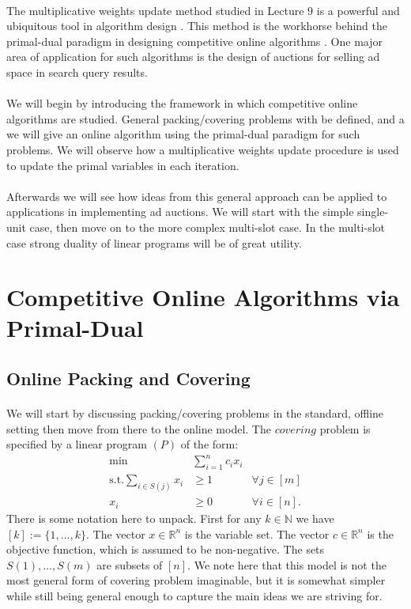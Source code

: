 \documentclass[letterpaper,12pt,oneside,onecolumn]{article}
\newcommand{\N}{\mathbb{N}} \newcommand{\R}{\mathbb{R}}
\begin{document}
\paragraph{}
The multiplicative weights update method studied in Lecture $9$ is a powerful and ubiquitous tool in algorithm design \cite{arora2012multiplicative}. This method is the workhorse behind the primal-dual paradigm in designing competitive online algorithms \cite{buchbinder2009design}. One major area of application for such algorithms is the design of auctions for selling ad space in search query results.
\paragraph{}
We will begin by introducing the framework in which competitive online algorithms are studied. General packing/covering problems with be defined, and a we will give an online algorithm using the primal-dual paradigm for such problems. We will observe how a multiplicative weights update procedure is used to update the primal variables in each iteration. 
\paragraph{}
Afterwards we will see how ideas from this general approach can be applied to applications in implementing ad auctions. We will start with the simple single-unit case, then move on to the more complex multi-slot case. In the multi-slot case strong duality of linear programs will be of great utility.
\section{Competitive Online Algorithms via Primal-Dual}
\subsection{Online Packing and Covering}
\paragraph{}
We will start by discussing packing/covering problems in the standard, offline setting then move from there to the online model. The $\textit{covering}$ problem is specified by a linear program $(P)$ of the form:
\begin{align*}
\min &\sum_{i=1}^n c_i x_i \\
\text{s.t.} \sum_{i \in S(j)} x_i &\geq 1 &\forall j \in [m]\\
x_i &\geq 0 &\forall  i \in [n].
\end{align*}
There is some notation here to unpack. First for any $k \in \N$ we have $[k] := \{1, \dots, k\}$. The vector $x \in \R^n$ is the variable set. The vector $c \in \R^n$ is the objective function, which is assumed to be non-negative. The sets $S(1), \dots, S(m)$ are subsets of $[n]$. We note here that this model is not the most general form of covering problem imaginable, but it is somewhat simpler while still being general enough to capture the main ideas we are striving for. 
\end{document}
